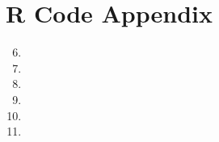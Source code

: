 \documentclass[11pt]{article}\usepackage[]{graphicx}\usepackage[]{color}
\begin{document}
\section*{R Code Appendix}

\begin{enumerate}

\setcounter{enumi}{5}
\item %

\item %

\item %

\item %

\item %

\item %

\end{enumerate}
\end{document}
